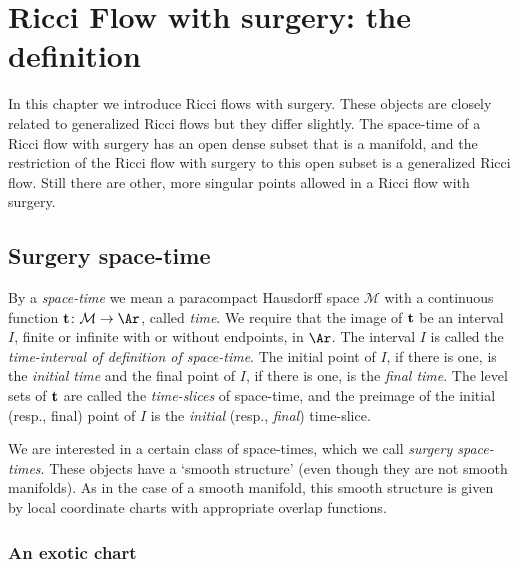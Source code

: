 \chapter{Ricci Flow with surgery: the definition}
\label{chap:ricci-flow-with-surgery}
\label{sect:surgery}



In this chapter we introduce Ricci flows with surgery. These objects
are closely related to generalized Ricci flows but they differ
slightly. The space-time of a Ricci flow with surgery has an open
dense subset that is a manifold, and the restriction of the Ricci
flow with surgery to this open subset is a generalized Ricci flow.
Still there are other, more singular points allowed in a Ricci flow
with surgery.

\section{Surgery space-time}


\begin{definition}
\label{def:space-time-general}
By a {\em space-time} we mean a paracompact Hausdorff space
${\mathcal M}$ with a continuous function ${\bf t}\colon {\mathcal
M}\to \Ar$, called {\em time}. We require that the image of ${\bf
t}$ be an interval $I$, finite or infinite with or without
endpoints, in $\Ar$. The interval $I$ is called the {\em time-interval of
definition of space-time}. The initial point of $I$, if there is
one,  is the {\em initial time} and the final point of $I$, if there
is one, is the {\em final time}. The level sets of ${\bf t}$ are
called the {\em time-slices} of space-time, and the preimage of the
initial (resp., final) point of $I$ is the {\em initial} (resp.,
{\em final}) time-slice.
\end{definition}

We are interested in a certain class of space-times, which we call
{\em surgery space-times}. These objects have a `smooth structure'
(even though they are not smooth manifolds). As in the case of a
smooth manifold, this smooth structure is given by local coordinate
charts with appropriate overlap functions.

\subsection{An exotic chart}

